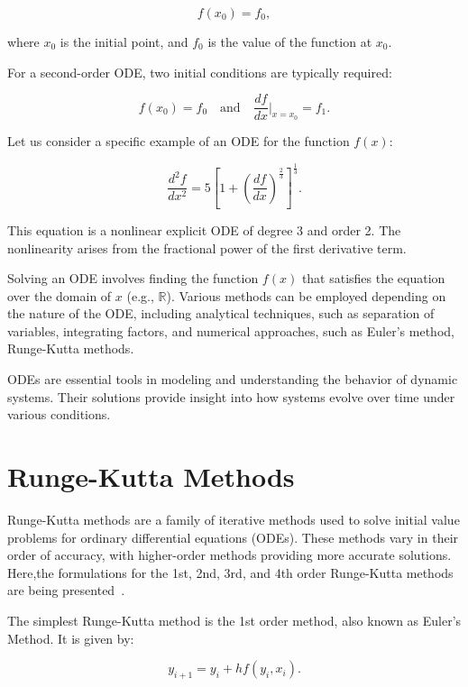 \documentclass[12pt,a4paper]{report}
\begin{document}
\begin{equation}
  f(x_0) = f_0,
\end{equation}

where \( x_0 \) is the initial point, and \( f_0 \) is the value of the function at \( x_0 \).

For a second-order ODE, two initial conditions are typically required:

\begin{equation}
  f(x_0) = f_0 \quad \text{and} \quad \frac{df}{dx}\Big|_{x=x_0} = f_1.
\end{equation}

Let us consider a specific example of an ODE for the function \( f(x) \):

\begin{equation}
  \frac{d^2 f}{dx^2} = 5 \left[1 + \left(\frac{df}{dx}\right)^{\frac{2}{3}}\right]^{\frac{1}{3}}.
\end{equation}

This equation is a nonlinear explicit ODE of degree 3 and order 2. The nonlinearity arises from the fractional power of the first derivative term.

Solving an ODE involves finding the function \( f(x) \) that satisfies the equation over the domain of \( x \) (e.g., \( \mathbb{R} \)). Various methods can be employed depending on the nature of the ODE, including analytical techniques, such as separation of variables, integrating factors, and numerical approaches, such as Euler's method, Runge-Kutta methods.

ODEs are essential tools in modeling and understanding the behavior of dynamic systems. Their solutions provide insight into how systems evolve over time under various conditions.

\section{Runge-Kutta Methods}
Runge-Kutta methods are a family of iterative methods used to solve initial value problems for ordinary differential equations (ODEs). These methods vary in their order of accuracy, with higher-order methods providing more accurate solutions. Here,the formulations for the 1st, 2nd, 3rd, and 4th order Runge-Kutta methods are being presented~\cite{odes}.

The simplest Runge-Kutta method is the 1st order method, also known as Euler's Method. It is given by:

\begin{equation}
  y_{i+1} = y_i + h f(y_i, x_i).
\end{equation}
\end{document}
